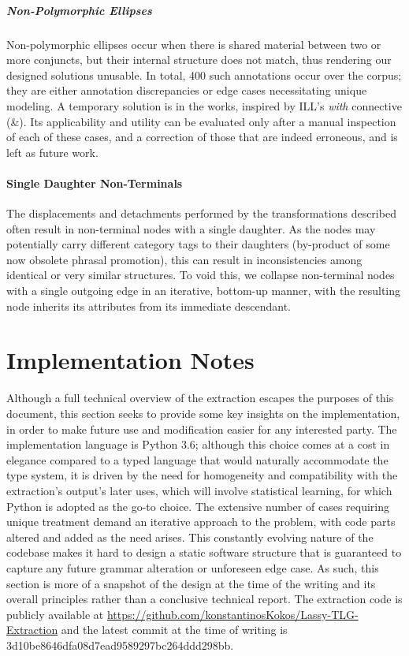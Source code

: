 \subparagraph{Non-Polymorphic Ellipses}
Non-polymorphic ellipses occur when there is shared material between two or more conjuncts, but their internal structure does not match, thus rendering our designed solutions unusable.
In total, 400 such annotations occur over the corpus; they are either annotation discrepancies or edge cases necessitating unique modeling. 
A temporary solution is in the works, inspired by ILL's \textit{with} connective (\&).
Its applicability and utility can be evaluated only after a manual inspection of each of these cases, and a correction of those that are indeed erroneous, and is left as future work.

\paragraph{Single Daughter Non-Terminals}
The displacements and detachments performed by the transformations described often result in non-terminal nodes with a single daughter. As the nodes may potentially carry different category tags to their daughters (by-product of some now obsolete phrasal promotion), this can result in inconsistencies among identical or very similar structures. To void this, we collapse non-terminal nodes with a single outgoing edge in an iterative, bottom-up manner, with the resulting node inherits its attributes from its immediate descendant.

\section{Implementation Notes}
Although a full technical overview of the extraction escapes the purposes of this document, this section seeks to provide some key insights on the implementation, in order to make future use and modification easier for any interested party.
The implementation language is Python 3.6; although this choice comes at a cost in elegance compared to a typed language that would naturally accommodate the type system, it is driven by the need for homogeneity and compatibility with the extraction's output's later uses, which will involve statistical learning, for which Python is adopted as the go-to choice.
The extensive number of cases requiring unique treatment demand an iterative approach to the problem, with code parts altered and added as the need arises.
This constantly evolving nature of the codebase makes it hard to design a static software structure that is guaranteed to capture any future grammar alteration or unforeseen edge case.
As such, this section is more of a snapshot of the design at the time of the writing and its overall principles rather than a conclusive technical report.
The extraction code is publicly available at \url{https://github.com/konstantinosKokos/Lassy-TLG-Extraction} and the latest commit at the time of writing is 3d10be8646dfa08d7ead9589297bc264ddd298bb.

